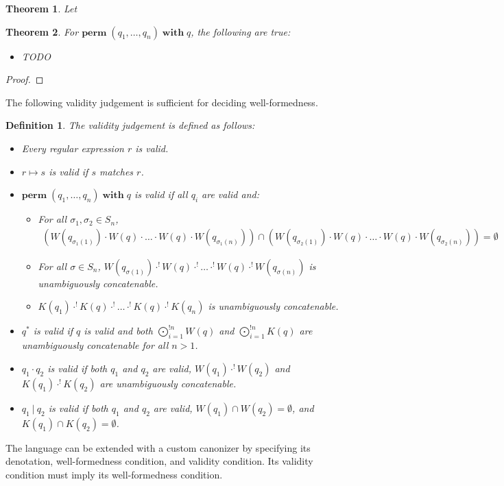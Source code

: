 \documentclass[a4paper,11pt] {article}
\theoremstyle{plain}
\newtheorem*{theorem*}{Theorem}
\newtheorem{definition}[theorem]{Definition}
\newcommand{\perm}{ \textbf{perm}\; }
\newcommand{\with}{ \;\textbf{with}\; }
\begin{document}
\begin{theorem*}
Let 
\end{theorem*}


\begin{theorem*}
  For $\perm(q_1,\ldots, q_n) \with q$, the following are true:
  \begin{itemize}
  \item TODO
  \end{itemize}
\end{theorem*}
\begin{proof}

  

\end{proof}

The following validity judgement
is sufficient for deciding well-formedness.
\begin{definition}
  The validity judgement is defined as follows:
  \begin{itemize}
  \item Every regular expression $r$ is valid.
  \item $r \mapsto s$ is valid if $s$ matches $r$.
  \item $\perm(q_1, \ldots, q_n) \with q$ is valid if all $q_i$ are
    valid and:
    \begin{itemize}
    \item For all $\sigma_1, \sigma_2 \in S_n$,
      \begin{align*}
        (W(q_{\sigma_1(1)}) \cdot W(q) \cdot \ldots
        \cdot W(q) \cdot W(q_{\sigma_1(n)})) \cap
        (W(q_{\sigma_2(1)}) \cdot W(q) \cdot \ldots
        \cdot W(q) \cdot W(q_{\sigma_2(n)})) = \emptyset
      \end{align*}
    \item For all $\sigma \in S_n$,
      $W(q_{\sigma(1)}) \cdot^! W(q) \cdot^!
      \ldots \cdot^! W(q) \cdot^! W(q_{\sigma(n)})$
      is unambiguously concatenable.
    \item $K(q_1) \cdot^! K(q) \cdot^! \ldots
    \cdot^! K(q) \cdot^! K(q_n)$ is unambiguously
    concatenable.
    \end{itemize}
  \item $q^*$ is valid if $q$ is valid and both
    $\bigodot_{i=1}^{!n} W(q)$ and $\bigodot_{i=1}^{!n} K(q)$ are
    unambiguously concatenable for all $n > 1$.
  \item $q_1 \cdot q_2$ is valid if both $q_1$ and $q_2$ are valid,
    $W(q_1) \cdot^{!} W(q_2)$ and $K(q_1) \cdot^{!} K(q_2)$ are unambiguously
    concatenable.
  \item $q_1 ~|~ q_2$ is valid if both $q_1$ and $q_2$ are valid,
    $W(q_1) \cap W(q_2) = \emptyset$, and $K(q_1) \cap K(q_2) = \emptyset$.
  \end{itemize}

\end{definition}
The language can be extended with a custom canonizer by specifying its
denotation, well-formedness condition, and validity condition. Its
validity condition must imply its well-formedness condition.
\end{document}
